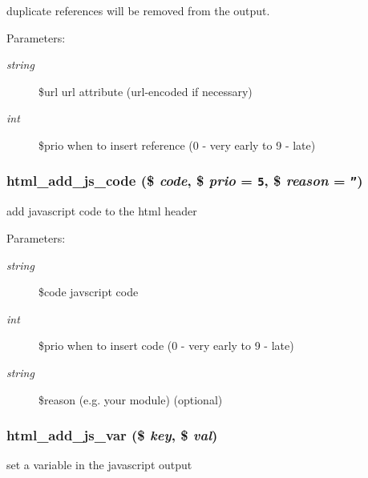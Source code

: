 duplicate references will be removed from the output. \begin{Desc}
\item[Parameters:]
\begin{description}
\item[{\em string}]\$url url attribute (url-encoded if necessary) \item[{\em int}]\$prio when to insert reference (0 - very early to 9 - late) \end{description}
\end{Desc}
\hypertarget{html_8inc_8php_90601d141e5751c07b61f32f623ed7d2}{
\subsubsection[{html\_\-add\_\-js\_\-code}]{\setlength{\rightskip}{0pt plus 5cm}html\_\-add\_\-js\_\-code (\$ {\em code}, \/  \$ {\em prio} = {\tt 5}, \/  \$ {\em reason} = {\tt ''})}}
\label{html_8inc_8php_90601d141e5751c07b61f32f623ed7d2}


add javascript code to the html header

\begin{Desc}
\item[Parameters:]
\begin{description}
\item[{\em string}]\$code javscript code \item[{\em int}]\$prio when to insert code (0 - very early to 9 - late) \item[{\em string}]\$reason (e.g. your module) (optional) \end{description}
\end{Desc}
\hypertarget{html_8inc_8php_84769b7fe7b5454ff46534d0577eb54c}{
\subsubsection[{html\_\-add\_\-js\_\-var}]{\setlength{\rightskip}{0pt plus 5cm}html\_\-add\_\-js\_\-var (\$ {\em key}, \/  \$ {\em val})}}
\label{html_8inc_8php_84769b7fe7b5454ff46534d0577eb54c}


set a variable in the javascript output


